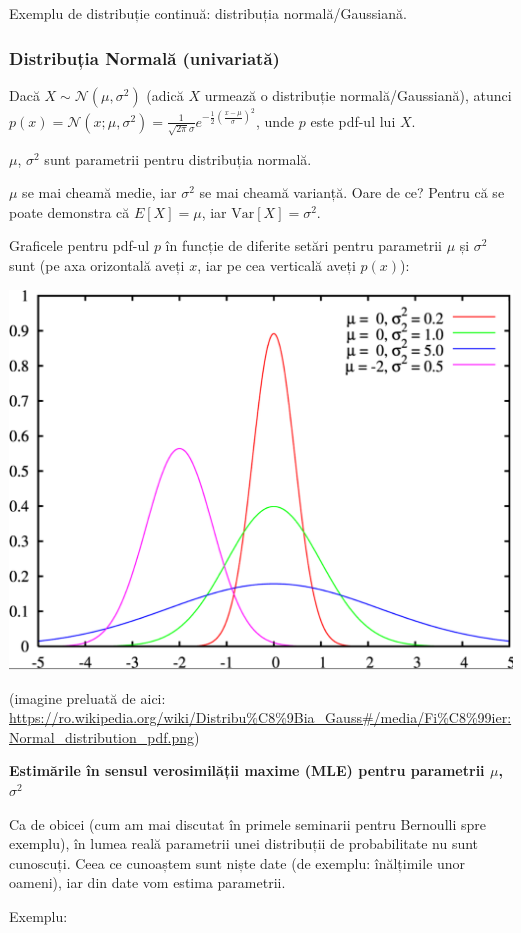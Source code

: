 \documentclass[12pt]{article}
\begin{document}
	Exemplu de distribuție continuă: distribuția normală/Gaussiană.
	
	\subsubsection{Distribuția Normală (univariată)}
	Dacă $X \sim \mathcal{N}(\mu,\sigma^2)$ (adică $X$ urmează o distribuție normală/Gaussiană), atunci $p(x) = \mathcal{N}(x;\mu,\sigma^2) = \frac{1}{\sqrt{2 \pi}\sigma} e^{-\frac{1}{2}\left(\frac{x-\mu}{\sigma}\right)^2}$, unde $p$ este pdf-ul lui $X$.
	
	$\mu$, $\sigma^2$ sunt parametrii pentru distribuția normală. 
	
	$\mu$ se mai cheamă medie, iar $\sigma^2$ se mai cheamă varianță. Oare de ce? Pentru că se poate demonstra că $E[X] = \mu$, iar $\text{Var}[X] = \sigma^2$.
	
	Graficele pentru pdf-ul $p$ în funcție de diferite setări pentru parametrii $\mu$ și $\sigma^2$ sunt (pe axa orizontală aveți $x$, iar pe cea verticală aveți $p(x)$):
	\begin{center}
		\includegraphics[width=0.7\linewidth]{screenshot001}
	\end{center}
	(imagine preluată de aici: \url{https://ro.wikipedia.org/wiki/Distribu%C8%9Bia_Gauss#/media/Fi%C8%99ier:Normal_distribution_pdf.png})
		
	\textbf{Estimările în sensul verosimilății maxime (MLE) pentru parametrii $\mu$, $\sigma^2$}
	
	Ca de obicei (cum am mai discutat în primele seminarii pentru Bernoulli spre exemplu), în lumea reală parametrii unei distribuții de probabilitate nu sunt cunoscuți. Ceea ce cunoaștem sunt niște date (de exemplu: înălțimile unor oameni), iar din date vom estima parametrii.
	
	Exemplu:
	
\end{document}
